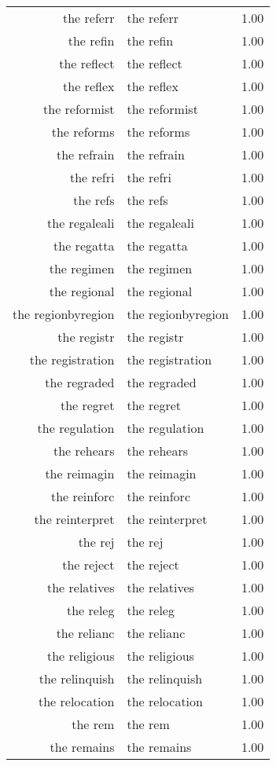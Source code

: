\begin{table}[ht]
\begin{tabular}{rlr}
  the referr & the referr & 1.00 \\ 
  the refin & the refin & 1.00 \\ 
  the reflect & the reflect & 1.00 \\ 
  the reflex & the reflex & 1.00 \\ 
  the reformist & the reformist & 1.00 \\ 
  the reforms & the reforms & 1.00 \\ 
  the refrain & the refrain & 1.00 \\ 
  the refri & the refri & 1.00 \\ 
  the refs & the refs & 1.00 \\ 
  the regaleali & the regaleali & 1.00 \\ 
  the regatta & the regatta & 1.00 \\ 
  the regimen & the regimen & 1.00 \\ 
  the regional & the regional & 1.00 \\ 
  the regionbyregion & the regionbyregion & 1.00 \\ 
  the registr & the registr & 1.00 \\ 
  the registration & the registration & 1.00 \\ 
  the regraded & the regraded & 1.00 \\ 
  the regret & the regret & 1.00 \\ 
  the regulation & the regulation & 1.00 \\ 
  the rehears & the rehears & 1.00 \\ 
  the reimagin & the reimagin & 1.00 \\ 
  the reinforc & the reinforc & 1.00 \\ 
  the reinterpret & the reinterpret & 1.00 \\ 
  the rej & the rej & 1.00 \\ 
  the reject & the reject & 1.00 \\ 
  the relatives & the relatives & 1.00 \\ 
  the releg & the releg & 1.00 \\ 
  the relianc & the relianc & 1.00 \\ 
  the religious & the religious & 1.00 \\ 
  the relinquish & the relinquish & 1.00 \\ 
  the relocation & the relocation & 1.00 \\ 
  the rem & the rem & 1.00 \\ 
  the remains & the remains & 1.00 \\ 

\end{tabular}
\end{table}
